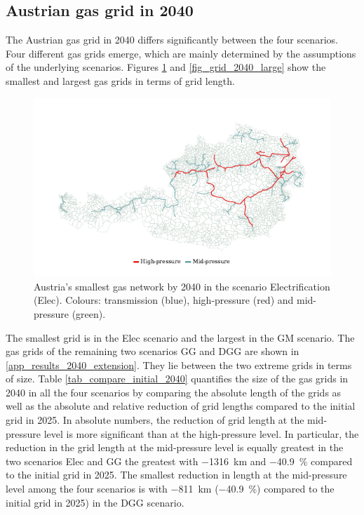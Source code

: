 \subsection{Austrian gas grid in 2040}\label{res_grid2040}
The Austrian gas grid in 2040 differs significantly between the four scenarios. Four different gas grids emerge, which are mainly determined by the assumptions of the underlying scenarios. Figures \ref{fig_grid_2040_small} and \ref{fig_grid_2040_large} show the smallest and largest gas grids in terms of grid length. 

\begin{figure}[h]
	\centering
	\includegraphics[width=1\linewidth]{figures/results/gas_grid_2040_elec_cleaned.pdf}
	\caption{Austria's smallest gas network by 2040 in the scenario Electrification (Elec). Colours: transmission (blue), high-pressure (red) and mid-pressure (green).}
	\label{fig_grid_2040_small}
\end{figure}

The smallest grid is in the Elec scenario and the largest in the GM scenario. The gas grids of the remaining two scenarios GG and DGG are shown in \ref{app_results_2040_extension}. They lie between the two extreme grids in terms of size. Table \ref{tab_compare_initial_2040} quantifies the size of the gas grids in 2040 in all the four scenarios by comparing the absolute length of the grids as well as the absolute and relative reduction of grid lengths compared to the initial grid in 2025.  In absolute numbers, the reduction of grid length at the mid-pressure level is more significant than at the high-pressure level. In particular, the reduction in the grid length at the mid-pressure level is equally greatest in the two scenarios Elec and GG the greatest with \SI{-1316}{km} and  \SI{-40.9}{\%} compared to the initial grid in 2025. The smallest reduction in length at the mid-pressure level among the four scenarios is with \SI{-811}{km} (\SI{-40.9}{\%}) compared to the initial grid in 2025) in the DGG scenario. 

